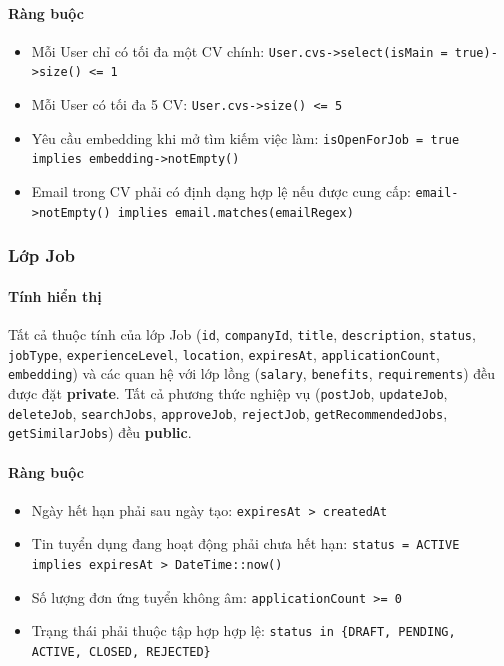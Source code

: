 \paragraph{Ràng buộc}
\begin{itemize}
    \item Mỗi User chỉ có tối đa một CV chính: \texttt{User.cvs->select(isMain = true)->size() <= 1}
    \item Mỗi User có tối đa 5 CV: \texttt{User.cvs->size() <= 5}
    \item Yêu cầu embedding khi mở tìm kiếm việc làm: \texttt{isOpenForJob = true implies embedding->notEmpty()}
    \item Email trong CV phải có định dạng hợp lệ nếu được cung cấp: \texttt{email->notEmpty() implies email.matches(emailRegex)}
\end{itemize}

\subsubsection{Lớp Job}

\paragraph{Tính hiển thị}
Tất cả thuộc tính của lớp Job (\texttt{id}, \texttt{companyId}, \texttt{title}, \texttt{description}, \texttt{status}, \texttt{jobType}, \texttt{experienceLevel}, \texttt{location}, \texttt{expiresAt}, \texttt{applicationCount}, \texttt{embedding}) và các quan hệ với lớp lồng (\texttt{salary}, \texttt{benefits}, \texttt{requirements}) đều được đặt \textbf{private}. Tất cả phương thức nghiệp vụ (\texttt{postJob}, \texttt{updateJob}, \texttt{deleteJob}, \texttt{searchJobs}, \texttt{approveJob}, \texttt{rejectJob}, \texttt{getRecommendedJobs}, \texttt{getSimilarJobs}) đều \textbf{public}.

\paragraph{Ràng buộc}
\begin{itemize}
    \item Ngày hết hạn phải sau ngày tạo: \texttt{expiresAt > createdAt}
    \item Tin tuyển dụng đang hoạt động phải chưa hết hạn: \texttt{status = ACTIVE implies expiresAt > DateTime::now()}
    \item Số lượng đơn ứng tuyển không âm: \texttt{applicationCount >= 0}
    \item Trạng thái phải thuộc tập hợp hợp lệ: \texttt{status in \{DRAFT, PENDING, ACTIVE, CLOSED, REJECTED\}}
\end{itemize}

